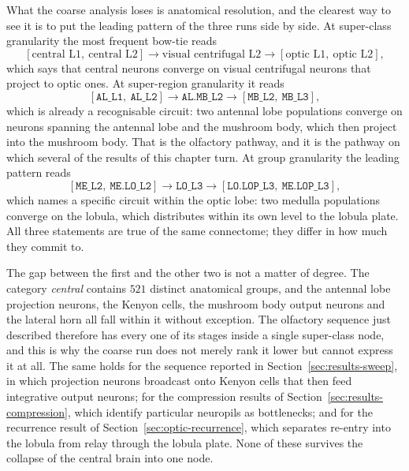 \documentclass[12pt,a4paper,oneside]{article}
\theoremstyle{definition}
\theoremstyle{plain}
\newcommand{\code}[1]{\texttt{#1}}
\begin{document}
What the coarse analysis loses is anatomical resolution, and the clearest way
to see it is to put the leading pattern of the three runs side by side. At
super-class granularity the most frequent bow-tie reads
\[
[\text{central L1},\ \text{central L2}] \rightarrow
\text{visual centrifugal L2} \rightarrow
[\text{optic L1},\ \text{optic L2}],
\]
which says that central neurons converge on visual centrifugal neurons that
project to optic ones. At super-region granularity it reads
\[
[\code{AL\_L1},\ \code{AL\_L2}] \rightarrow \code{AL.MB\_L2} \rightarrow
[\code{MB\_L2},\ \code{MB\_L3}],
\]
which is already a recognisable circuit: two antennal lobe populations
converge on neurons spanning the antennal lobe and the mushroom body, which
then project into the mushroom body. That is the olfactory pathway, and it is
the pathway on which several of the results of this chapter turn. At group
granularity the leading pattern reads
\[
[\code{ME\_L2},\ \code{ME.LO\_L2}] \rightarrow \code{LO\_L3} \rightarrow
[\code{LO.LOP\_L3},\ \code{ME.LOP\_L3}],
\]
which names a specific circuit within the optic lobe: two medulla populations
converge on the lobula, which distributes within its own level to the lobula
plate. All three statements are true of the same connectome; they differ in
how much they commit to.

The gap between the first and the other two is not a matter of degree. The
category \emph{central} contains $521$ distinct anatomical groups, and the
antennal lobe projection neurons, the Kenyon cells, the mushroom body output
neurons and the lateral horn all fall within it without exception. The
olfactory sequence just described therefore has every one of its stages
inside a single super-class node, and this is why the coarse run does not
merely rank it lower but cannot express it at all. The same holds for the
sequence reported in Section~\ref{sec:results-sweep}, in which projection
neurons broadcast onto Kenyon cells that then feed integrative output
neurons; for the compression results of Section~\ref{sec:results-compression},
which identify particular neuropils as bottlenecks; and for the recurrence
result of Section~\ref{sec:optic-recurrence}, which separates re-entry into
the lobula from relay through the lobula plate. None of these survives the
collapse of the central brain into one node.
\end{document}
